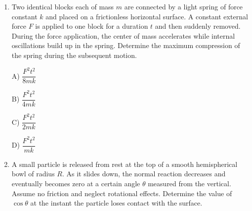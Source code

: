 \documentclass[12pt]{article}
\begin{document}
\begin{enumerate}
A) $\dfrac{u^2\sin2\theta}{g}$

B) $\dfrac{u}{qB}\sin\theta$

C) undefined (no return)

D) depends on $B$

\item

Two identical blocks each of mass $m$ are connected by a light spring of force constant $k$ and placed on a frictionless horizontal surface. 
A constant external force $F$ is applied to one block for a duration $t$ and then suddenly removed. 
During the force application, the center of mass accelerates while internal oscillations build up in the spring. 
Determine the maximum compression of the spring during the subsequent motion.

\begin{center}
\end{center}


A) $\dfrac{F^2t^2}{8mk}$

B) $\dfrac{F^2t^2}{4mk}$

C) $\dfrac{F^2t^2}{2mk}$

D) $\dfrac{F^2t^2}{mk}$

\item 
A small particle is released from rest at the top of a smooth hemispherical bowl of radius $R$. 
As it slides down, the normal reaction decreases and eventually becomes zero at a certain angle $\theta$ measured from the vertical. 
Assume no friction and neglect rotational effects. 
Determine the value of $\cos\theta$ at the instant the particle loses contact with the surface.

\begin{center}
\begin{tikzpicture}[scale=1]


\end{tikzpicture}
\end{center}
\end{enumerate}
\end{document}
